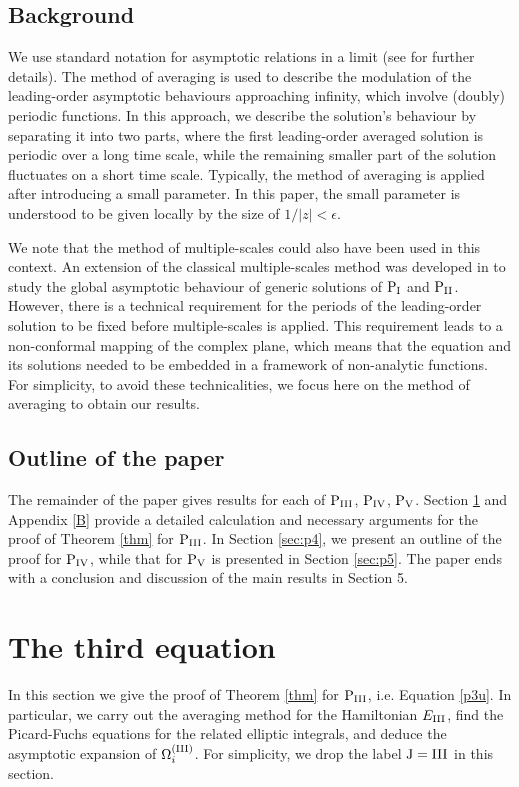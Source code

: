 \documentclass[a4paper,reqno]{amsart}
\theoremstyle{definition}
\theoremstyle{remark}
\theoremstyle{theorem}
\numberwithin{equation}{section}
\begin{document}
\subsection{Background}
We use standard notation for asymptotic relations in a limit (see \cite{BO1999} for further details). The method of averaging \cite{SVM2007} is used to describe the modulation of the leading-order asymptotic behaviours approaching infinity, which involve (doubly) periodic functions. In this approach, we describe the solution's behaviour by separating it into two parts, where the first leading-order averaged solution is periodic over a long time scale, while the remaining smaller part of the solution fluctuates on a short time scale.  Typically, the method of averaging is applied after introducing a small parameter. In this paper, the small parameter is understood to be given locally by the size of $1/|z|<\epsilon$. 

We note that the method of multiple-scales could also have been used in this context. An extension of the classical multiple-scales method was developed in \cite{JoshiThesis, JK1988} to study the global asymptotic behaviour of generic solutions of $\text{P$_{\text{I}}$}$ and $\text{P$_{\text{II}}$}$. However, there is a technical requirement for the periods of the leading-order solution to be fixed before multiple-scales is applied. This requirement leads to a non-conformal mapping of the complex plane, which means that the equation and its solutions needed to be embedded in a framework of non-analytic functions. For simplicity, to avoid these technicalities, we focus here on the method of averaging to obtain our results. 

\subsection{Outline of the paper} 
The remainder of the paper gives results for each of $\text{P$_{\text{III}}$}$, $\text{P$_{\text{IV}}$}$, $\text{P$_{\text{V}}$}$. Section \ref{sec:p3} and Appendix \ref{B} provide a detailed calculation and necessary arguments for the proof of Theorem \ref{thm} for $\text{P$_{\text{III}}$}$. In Section \ref{sec:p4}, we present an outline of the proof for $\text{P$_{\text{IV}}$}$, while that for $\text{P$_{\text{V}}$}$ is presented in Section \ref{sec:p5}. The paper ends with a conclusion and discussion of the main results in Section 5.

\section{The third \pv equation}\label{sec:p3}
In this section we give the proof of Theorem \ref{thm} for $\text{P$_{\text{III}}$}$, i.e. Equation \eqref{p3u}. In particular, we carry out the averaging method for the Hamiltonian $E_{\rm III}$, find the Picard-Fuchs equations for the related elliptic integrals, and deduce the asymptotic expansion of $\Omega_i^{\rm (III)}$. For simplicity, we drop the label $\rm J=III$ in this section. 
\end{document}

